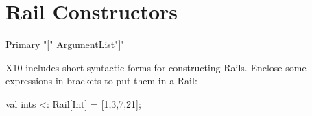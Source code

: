 
\section{Rail Constructors}
\label{sect:RailCtors}


\begin{bbgrammar}
             Primary \: 
                    \xcd"[" ArgumentList\opt \xcd"]" 
\end{bbgrammar}

X10 includes short syntactic forms for constructing Rails.
Enclose some expressions in brackets to put them in a Rail: 
\begin{xten}
val ints <: Rail[Int] = [1,3,7,21];
\end{xten}


